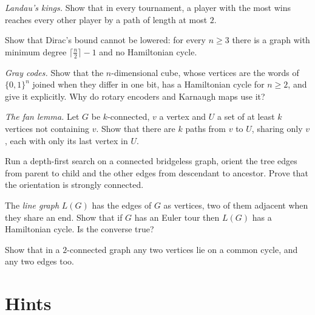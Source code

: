 \begin{exercise}[$\star$]\label{ex:king}
\emph{Landau's kings.} Show that in every tournament, a player with the most wins reaches every other player by a path of
length at most $2$.
\end{exercise}

\begin{exercise}[$\star$]\label{ex:diracsharp}
Show that Dirac's bound cannot be lowered: for every $n\ge3$ there is a graph with minimum degree $\lceil\frac n2\rceil-1$ and no Hamiltonian cycle.
\end{exercise}

\begin{exercise}[$\star$]\label{ex:gray}
\emph{Gray codes.} Show that the $n$-dimensional cube, whose vertices are the words of $\{0,1\}^n$ joined when they differ in one bit, has a
Hamiltonian cycle for $n\ge2$, and give it explicitly. Why do rotary encoders and Karnaugh maps use it?
\end{exercise}

\begin{exercise}[$\star\star$]\label{ex:fan}
\emph{The fan lemma.} Let $G$ be $k$-connected, $v$ a vertex and $U$ a set of at least $k$ vertices not containing $v$. Show that there are $k$ paths from
$v$ to $U$, sharing only $v$, each with only its last vertex in $U$.
\end{exercise}

\begin{exercise}[$\star\star$]\label{ex:robbinsdfs}
Run a depth-first search on a connected bridgeless graph, orient the tree edges from parent to child and the other edges from
descendant to ancestor. Prove that the orientation is strongly connected.
\end{exercise}

\begin{exercise}[$\star\star$]\label{ex:linegraph}
The \emph{line graph} $L(G)$ has the edges of $G$ as vertices, two of them adjacent when they share an end. Show that if $G$ has an Euler
tour then $L(G)$ has a Hamiltonian cycle. Is the converse true?
\end{exercise}

\begin{exercise}[$\star\star$]\label{ex:twoconnected}
Show that in a $2$-connected graph any two vertices lie on a common cycle, and any two edges too.
\end{exercise}

\section{Hints}

